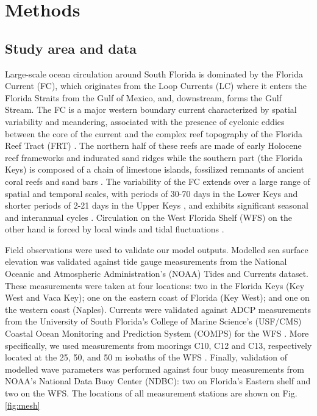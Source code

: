 \documentclass[11pt,a4paper]{article}
\begin{document}
\section{Methods}
\subsection{Study area and data}
Large-scale ocean circulation around South Florida is dominated by the Florida Current (FC), which originates from the Loop Currents (LC) where it enters the Florida Straits from the Gulf of Mexico, and, downstream, forms the Gulf Stream. The FC is a major western boundary current characterized by spatial variability and meandering, associated with the presence of cyclonic eddies between the core of the current and the complex reef topography of the Florida Reef Tract (FRT) \citep{lee1995florida,kourafalou2012florida}. The northern half of these reefs are made of early Holocene reef frameworks and indurated sand ridges while the southern part (the Florida Keys) is composed of a chain of limestone islands, fossilized remnants of ancient coral reefs and sand bars \citep{hoffmeister1968geology,shinn1988geology,lidz1991paleoshorelines}. The variability of the FC extends over a large range of spatial and temporal scales, with periods of 30-70 days in the Lower Keys \citep{lee1995florida} and shorter periods of 2-21 days in the Upper Keys \citep{lee1977low}, and exhibits significant seasonal and interannual cycles \citep{johns1987meandering, lee1988wind,schott1988variability}. Circulation on the West Florida Shelf (WFS) on the other hand is forced by local winds and tidal fluctuations \citep{lee2002volume,liu2012seasonal}.

Field observations were used to validate our model outputs. Modelled sea surface elevation was validated against tide gauge measurements from the National Oceanic and Atmospheric Administration’s (NOAA) Tides and Currents dataset. These measurements were taken at four locations: two in the Florida Keys (Key West and Vaca Key); one on the eastern coast of Florida (Key West); and one on the western coast (Naples). Currents were validated against ADCP measurements from the University of South Florida's College of Marine Science's (USF/CMS) Coastal Ocean Monitoring and Prediction System (COMPS) for the WFS \citep{weisberg2009mean}. More specifically, we used measurements from moorings C10, C12 and C13, respectively located at the 25, 50, and 50 m isobaths of the WFS \citep{liu2020impacts}. Finally, validation of modelled wave parameters was performed against four buoy measurements from NOAA's National Data Buoy Center (NDBC): two on Florida's Eastern shelf and two on the WFS. The locations of all measurement stations are shown on Fig. \ref{fig:mesh}
\end{document}

